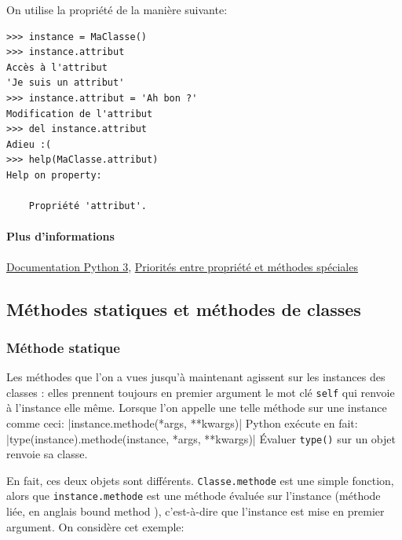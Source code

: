\documentclass[a4paper, 10pt]{article}
\begin{document}
On utilise la propriété de la manière suivante:
\begin{verbatim}
>>> instance = MaClasse()
>>> instance.attribut
Accès à l'attribut
'Je suis un attribut'
>>> instance.attribut = 'Ah bon ?'
Modification de l'attribut
>>> del instance.attribut
Adieu :(
>>> help(MaClasse.attribut)
Help on property:

    Propriété 'attribut'.

\end{verbatim}

\paragraph{Plus d'informations}\href{https://docs.python.org/fr/3/library/functions.html?highlight=property#property}{Documentation Python 3}, \href{https://stackoverflow.com/questions/15750522/class-properties-and-setattr/15751159#15751159}{Priorités entre propriété et méthodes spéciales}

\subsection{Méthodes statiques et méthodes de classes}
\subsubsection{Méthode statique}
\label{sec:staticmethod}
Les méthodes que l'on a vues jusqu'à maintenant agissent sur les instances des classes : elles prennent toujours en premier argument le mot clé \texttt{self} qui renvoie à l'instance elle même. Lorsque l'on appelle une telle méthode sur une instance comme ceci:
|instance.methode(*args, **kwargs)|
Python exécute en fait: |type(instance).methode(instance, *args, **kwargs)|
Évaluer \texttt{type()} sur un objet renvoie sa classe.

En fait, ces deux objets sont différents. \texttt{Classe.methode} est une simple fonction, alors que \texttt{instance.methode} est une méthode évaluée sur l'instance (méthode liée, en anglais \og bound method \fg{}), c'est-à-dire que l'instance est mise en premier argument. On considère cet exemple:
\end{document}
